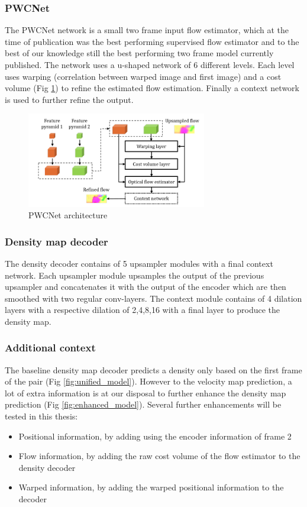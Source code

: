 \subsubsection{PWCNet}
The PWCNet network is a small two frame input flow estimator, which at the time of publication was the best performing supervised flow estimator and to the best of our knowledge still the best performing two frame model currently published. The network uses a u-shaped network of 6 different levels. Each level uses warping (correlation between warped image and first image) and a cost volume (Fig \ref{fig:pwc_base}) to refine the estimated flow estimation. Finally a context network is used to further refine the output.

\begin{figure}[h]
\centering
\includegraphics[width=0.7\textwidth]{images/pwcnet_approach}
\caption{PWCNet architecture}
\label{fig:pwc_base}
\end{figure}

\subsubsection{Density map decoder}
The density decoder contains of 5 upsampler modules with a final context network. Each upsampler module upsamples the output of the previous upsampler and concatenates it with the output of the encoder which are then smoothed with two regular conv-layers. The context module contains of 4 dilation layers with a respective dilation of 2,4,8,16 with a final layer to produce the density map.


\subsubsection{Additional context}
The baseline density map decoder predicts a density only based on the first frame of the pair (Fig \ref{fig:unified_model}). However to the velocity map prediction, a lot of extra information is at our disposal to further enhance the density map prediction (Fig \ref{fig:enhanced_model}). Several further enhancements will be tested in this thesis:
\begin{itemize}
	\item Positional information, by adding using the encoder information of frame 2
	\item Flow information, by adding the raw cost volume of the flow estimator to the density decoder
	\item Warped information, by adding the warped positional information to the decoder
\end{itemize}

